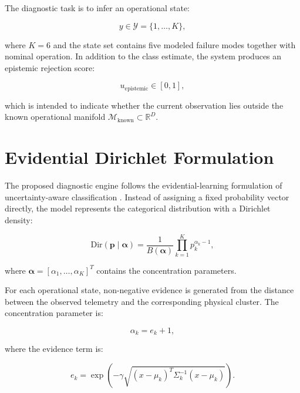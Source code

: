 \documentclass[conference]{IEEEtran}
\begin{document}
The diagnostic task is to infer an operational state:

\begin{equation}
y\in\mathcal{Y}=\{1,\ldots,K\},
\end{equation}

where $K=6$ and the state set contains five modeled failure modes together with nominal operation. In addition to the class estimate, the system produces an epistemic rejection score:

\begin{equation}
u_{\mathrm{epistemic}}\in[0,1],
\end{equation}

which is intended to indicate whether the current observation lies outside the known operational manifold $\mathcal{M}_{\mathrm{known}}\subset \mathbb{R}^{D}$.

\section{Evidential Dirichlet Formulation}

The proposed diagnostic engine follows the evidential-learning formulation of uncertainty-aware classification \cite{sensoy2018evidential, malinin2018predictive}. Instead of assigning a fixed probability vector directly, the model represents the categorical distribution with a Dirichlet density:

\begin{equation}
\mathrm{Dir}(\mathbf{p}\mid\boldsymbol{\alpha}) = \frac{1}{B(\boldsymbol{\alpha})} \prod_{k=1}^{K}p_k^{\alpha_k-1},
\label{eq:dirichlet}
\end{equation}

where $\boldsymbol{\alpha}=[\alpha_1,\ldots,\alpha_K]^T$ contains the concentration parameters.

For each operational state, non-negative evidence is generated from the distance between the observed telemetry and the corresponding physical cluster. The concentration parameter is:

\begin{equation}
\alpha_k=e_k+1,
\label{eq:alpha}
\end{equation}

where the evidence term is:

\begin{equation}
e_k = \exp\left(-\gamma \sqrt{(x-\mu_k)^T \Sigma_k^{-1} (x-\mu_k)}\right).
\label{eq:evidence}
\end{equation}
\end{document}
